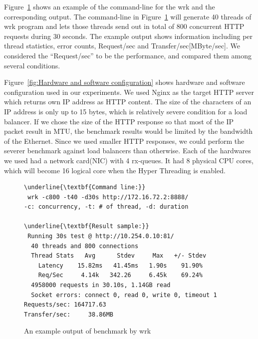 Figure~\ref{fig:benchmark example} shows an example of the command-line for the wrk and the corresponding output.
The command-line in Figure~\ref{fig:benchmark example} will generate 40 threads of wrk program 
and lets those threads send out in total of 800 concurrent HTTP requests during 30 seconds.
The example output shows information including per thread statistics, error counts, Request/sec and Transfer/sec[MByte/sec].
We considered the \enquote{Request/sec} to be the performance, and compared them among several conditions.

Figure~\ref{fig:Hardware and software configuration} shows hardware and software configuration used in our experiments.
We used Nginx as the target HTTP server which returns own IP address as HTTP content. 
The size of the characters of an IP address is only up to 15 bytes, 
which is relatively severe condition for a load balancer.
If we chose the size of the HTTP response so that most of the IP packet result in MTU,
the benchmark results would be limited by the bandwidth of the Ethernet.
Since we used smaller HTTP responses, we could perform the severer benchmark against load balancers than otherwise.
Each of the hardwares we used had a network card(NIC) with 4 rx-queues.
It had 8 physical CPU cores, which will become 16 logical core when the Hyper Threading is enabled.

\begin{figure}
\begin{minipage}{\columnwidth}
\small
\begin{Verbatim}[commandchars=\\\{\}]
\underline{\textbf{Command line:}}
 wrk -c800 -t40 -d30s http://172.16.72.2:8888/
-c: concurrency, -t: # of thread, -d: duration

\underline{\textbf{Result sample:}}
 Running 30s test @ http://10.254.0.10:81/
  40 threads and 800 connections
  Thread Stats   Avg      Stdev     Max   +/- Stdev
    Latency    15.82ms   41.45ms   1.90s    91.90%
    Req/Sec     4.14k   342.26     6.45k    69.24%
  4958000 requests in 30.10s, 1.14GB read
  Socket errors: connect 0, read 0, write 0, timeout 1
Requests/sec: 164717.63
Transfer/sec:     38.86MB
\end{Verbatim}
\end{minipage}
\caption{An example output of benchmark by wrk}
\label{fig:benchmark example}
\end{figure}

